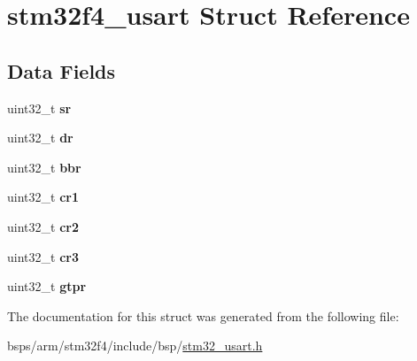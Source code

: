 \hypertarget{structstm32f4__usart}{}\section{stm32f4\+\_\+usart Struct Reference}
\label{structstm32f4__usart}
\subsection*{Data Fields}
\begin{DoxyCompactItemize}
\item 
\mbox{\label{structstm32f4__usart_afc572a8841076892c155babe443dd247}} 
uint32\+\_\+t {\bfseries sr}
\item 
\mbox{\label{structstm32f4__usart_a3792d0d2588d2e0910b7763391d1ed41}} 
uint32\+\_\+t {\bfseries dr}
\item 
\mbox{\label{structstm32f4__usart_a6491a89b8b6980dc15b77768dfd2a32c}} 
uint32\+\_\+t {\bfseries bbr}
\item 
\mbox{\label{structstm32f4__usart_a524b665529998f67923a205817aac300}} 
uint32\+\_\+t {\bfseries cr1}
\item 
\mbox{\label{structstm32f4__usart_a0bafc8f6c6118ef2b153ece286733599}} 
uint32\+\_\+t {\bfseries cr2}
\item 
\mbox{\label{structstm32f4__usart_a8cd238146b49962b99f6a3a04a4da5f8}} 
uint32\+\_\+t {\bfseries cr3}
\item 
\mbox{\label{structstm32f4__usart_a6b3fff73b503c08970d4883a46d0af2c}} 
uint32\+\_\+t {\bfseries gtpr}
\end{DoxyCompactItemize}


The documentation for this struct was generated from the following file\+:\begin{DoxyCompactItemize}
\item 
bsps/arm/stm32f4/include/bsp/\mbox{\hyperlink{stm32__usart_8h}{stm32\+\_\+usart.\+h}}\end{DoxyCompactItemize}
